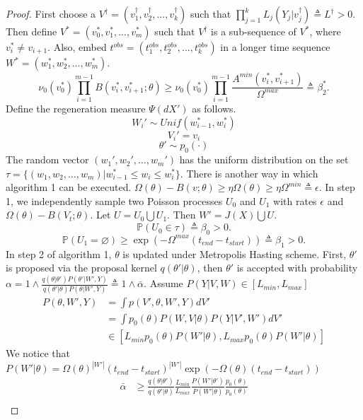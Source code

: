 \begin{proof}
First choose a $V^\dagger = (v_1^\dagger, v_2^\dagger,..., v_k^\dagger)$ such that $\prod_{j = 1}^k L_j(Y_j|v_j^\dagger) \triangleq L^\dagger > 0$. Then define $V^\ast = (v_0^ \ast, v_1^\ast, ...,v_m^\ast)$ such that $V^\dagger$ is a sub-sequence of $V^\ast$, where $v_i^\ast \neq v_{i + 1}$. Also, embed $t^{obs} = (t_1^{obs}, t_2^{obs},..., t_k^{obs})$ in a longer time sequence $W^\ast = (w_1^\ast, w_2^\ast,...,w_m^\ast)$.\\
$$\nu_0(v_0^\ast) \prod_{i = 1} ^ {m - 1}B(v_i^\ast,v_{i + 1}^\ast; \theta) \geq \nu_0(v_0^\ast) \prod_{i = 1} ^ {m - 1} \frac{A^{min}(v_i^\ast,v_{i + 1}^\ast)}{\Omega^{max}} \triangleq \beta_2^\ast.$$
Define the regeneration measure $\Psi(dX')$ as follows.\\
$$W_i' \sim Unif(w_{i - 1}^\ast, w_i^\ast)$$ 
$$V_i' = v_i$$
$$\theta' \sim p_0(\cdot)$$
The random vector $(w_1', w_2',...,w_m')$ has the uniform distribution on the set $\tau = \{ (w_1, w_2,...,w_m)|w_{i - 1}^\ast \leq w_i\leq w_i^\ast\}$. There is another way in which algorithm 1 can be executed. $\Omega(\theta) - B(v; \theta) \geq \eta \Omega(\theta) \geq \eta \Omega^{min} \triangleq \epsilon$. In step 1, we independently sample two Poisson processes $U_0$ and $U_1$ with rates $\epsilon$ and $\Omega(\theta) - B(V_t; \theta)$. Let $U = U_0 \bigcup U_1$. Then $W' = J(X) \bigcup U$. $$\mathbb{P}(U_0 \in \tau) \triangleq \beta_0 > 0.$$
$$\mathbb{P}(U_1 = \varnothing) \geq \exp(-\Omega^{max}(t_{end} - t_{start})) \triangleq \beta_1 > 0.$$
In step 2 of algorithm 1, $\theta$ is updated under Metropolis Hasting scheme. First, $\theta'$ is proposed via the proposal kernel $q(\theta'| \theta)$, then $\theta'$ is accepted with probability $\alpha = 1 \wedge \frac{q(\theta | \theta')P(\theta'| W', Y)}{q(\theta' | \theta)P(\theta| W', Y)} \triangleq 1 \wedge \bar{\alpha}$. Assume $P(Y | V, W) \in [L_{min}, L_{max}]$
\begin{align*}
P(\theta, W', Y) &= \int p(V', \theta, W', Y) dV'\\
&= \int p_0(\theta)P(W, V | \theta)P(Y | V', W') dV'\\
&\in [L_{min}p_0(\theta)P(W'| \theta), L_{max}p_0(\theta)P(W'| \theta)]
\end{align*} 
We notice that $P(W' | \theta) = \Omega(\theta)^{|W'|}(t_{end} - t_{start})^{|W'|}\exp(-\Omega(\theta)(t_{end} - t_{start}))$
\begin{align*}
\bar{\alpha} &\geq \frac{q(\theta | \theta' )}{q(\theta' | \theta)} \frac{L_{min}}{L_{max}}\frac{P(W' | \theta')}{P(W'|\theta)}\frac{p_0(\theta)}{p_0(\theta)}\\

\end{align*}
\end{proof}
